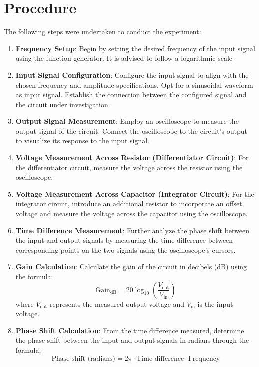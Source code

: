 \section{Procedure}
The following steps were undertaken to conduct the experiment:

\begin{enumerate}

    \item \textbf{Frequency Setup}: 
    Begin by setting the desired frequency of the input signal using the function generator. It is advised to follow a logarithmic scale
    
    \item \textbf{Input Signal Configuration}: 
    Configure the input signal to align with the chosen frequency and amplitude specifications. Opt for a sinusoidal waveform as input signal. Establish the connection between the configured signal and the circuit under investigation.
    
    \item \textbf{Output Signal Measurement}: 
    Employ an oscilloscope to measure the output signal of the circuit. Connect the oscilloscope to the circuit's output to visualize its response to the input signal.
    
    \item \textbf{Voltage Measurement Across Resistor (Differentiator Circuit)}: 
    For the differentiator circuit, measure the voltage across the resistor using the oscilloscope. 
    
    \item \textbf{Voltage Measurement Across Capacitor (Integrator Circuit)}: 
    For the integrator circuit, introduce an additional resistor to incorporate an offset voltage and measure the voltage across the capacitor using the oscilloscope. 
    
    \item \textbf{Time Difference Measurement}: 
    Further analyze the phase shift between the input and output signals by measuring the time difference between corresponding points on the two signals using the oscilloscope's cursors.
    
    \item \textbf{Gain Calculation}: 
    Calculate the gain of the circuit in decibels (dB) using the formula: $$ \text{Gain}_{\text{dB}} = 20 \log_{10} \left( \frac{V_{\text{out}}}{V_{\text{in}}} \right) $$
    where $V_{\text{out}}$ represents the measured output voltage and $V_{\text{in}}$ is the input voltage.
    
    \item \textbf{Phase Shift Calculation}: 
    From the time difference measured, determine the phase shift between the input and output signals in radians through the formula:
    $$ \text{Phase shift (radians)} = 2\pi \cdot \text{Time difference} \cdot \text{Frequency}$$

\end{enumerate}
